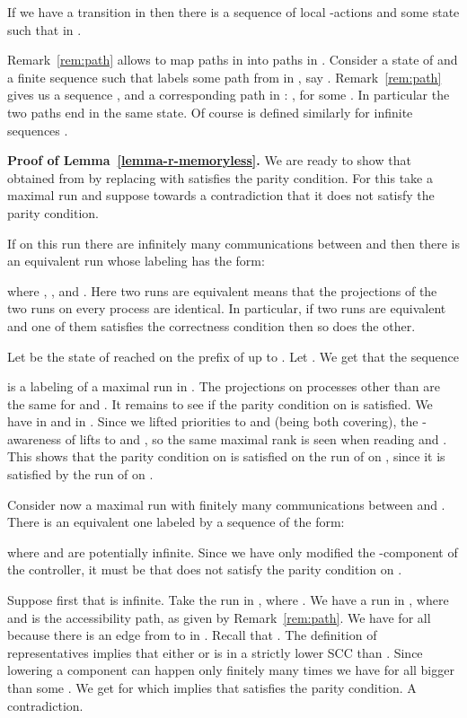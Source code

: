 \documentclass[10pt,a4paper]{article}
\begin{document}
  \begin{remark}\label{rem:path}
    If we have a transition  in  then
    there is a sequence  of local -actions and
    some state  such that
     in .
  \end{remark}
 

  Remark~\ref{rem:path} allows to map paths in  into paths
  in . Consider a state  of  and a finite
  sequence  such that  labels some path
  from  in , say . Remark~\ref{rem:path} gives us a
  sequence , and a
  corresponding path in : , for some . In particular the two paths end in the same state. Of
  course  is defined similarly for infinite
  sequences .

\medskip

\textbf{Proof of Lemma~\ref{lemma-r-memoryless}.}
  We are ready to show that  obtained from  by replacing 
  with  satisfies the parity condition. For this take a
  maximal run and suppose towards a contradiction
  that it does not satisfy the parity condition.

  If on this run there are infinitely many communications between  and  
  then there is an equivalent run whose labeling has the form:
  
  where , , and . Here two runs are equivalent means that the
  projections of the two runs on every process are identical. In
  particular, if two runs are equivalent and one of them satisfies the
  correctness condition then so does the other. 

  Let  be the state of
   reached on the prefix of  up to . Let
  . We get that the sequence
  
  is a labeling of a maximal run in . The projections on processes other than  are
  the same for  and . It remains to see if the parity condition
  on  is satisfied. We have  in
   and  in . Since we
  lifted priorities to  and  (being both covering),  the
  -awareness of   lifts to  and , so the
  same maximal rank is seen when reading  and . This shows
  that the parity condition on  is satisfied on the run of
   on , since it is satisfied by the run of  on .


  Consider now a maximal run with finitely many communications between
   and . There is an equivalent one labeled by a sequence of the
  form: 
  
  where  and  are potentially infinite. Since we have only
  modified the -component of the controller, it must be  that
  does not satisfy the parity condition on . 

  Suppose first that  is infinite. Take the run
   in , where . We have a run
   in
  , where  and  is the accessibility path,
  as given by Remark~\ref{rem:path}. We have  for all
   because there is an edge from  to  in
  . Recall that . The definition of
  representatives implies that either  or
   is in a strictly lower SCC than . Since lowering a
  component can happen only finitely many times we have
   for all  bigger than some . We get
   for  which implies that  satisfies the
  parity condition. A contradiction. 
\end{document}
